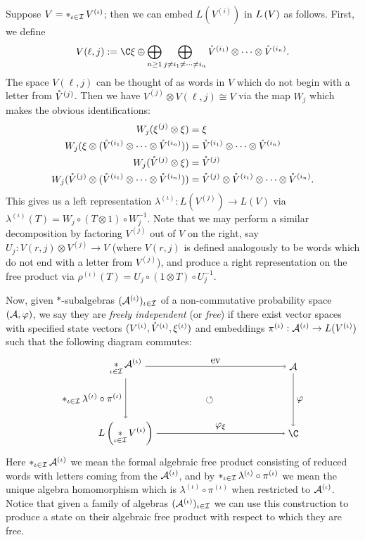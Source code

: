 Suppose $V = \mathop{\ast}_{\iota\in\mathcal{I}}V^{(\iota)}$; then we can embed $L(V^{(i)})$ in $L\left(V\right)$ as follows.
First, we define
$$V(\ell, j) := \C\xi \oplus\bigoplus_{n\geq1}\bigoplus_{j\neq i_1\neq \cdots\neq i_n}\oV^{(i_1)}\otimes\cdots\otimes\oV^{(i_n)}.$$
The space $V(\ell, j)$ can be thought of as words in $V$ which do not begin with a letter from $\mathring{V}^{(j)}$.
Then we have $V^{(j)}\otimes V(\ell, j) \cong V$ via the map $W_j$ which makes the obvious identifications:
\begin{align*}
	W_j(\xi^{(j)}\otimes\xi) &= \xi \\
	W_j(\xi\otimes(\mathring{V}^{(i_1)}\otimes\cdots\otimes\mathring{V}^{(i_n)})) &= \mathring{V}^{(i_1)}\otimes\cdots\otimes\mathring{V}^{(i_n)} \\
	W_j(\mathring{V}^{(j)}\otimes\xi) &= \mathring{V}^{(j)} \\
	W_j(\mathring{V}^{(j)}\otimes(\mathring{V}^{(i_1)}\otimes\cdots\otimes\mathring{V}^{(i_n)})) &= \mathring{V}^{(j)}\otimes\mathring{V}^{(i_1)}\otimes\cdots\otimes\mathring{V}^{(i_n)}.
\end{align*}
This gives us a left representation $\lambda^{(\iota)} : L(V^{(j)}) \to L(V)$ via $\lambda^{(\iota)}(T) = W_j\circ(T\otimes 1)\circ W_j^{-1}$.
Note that we may perform a similar decomposition by factoring $V^{(j)}$ out of $V$ on the right, say $U_j : V(r, j)\otimes V^{(j)} \to V$ (where $V(r, j)$ is defined analogously to be words which do not end with a letter from $V^{(j)}$), and produce a right representation on the free product via $\rho^{(\iota)}(T) = U_j\circ(1\otimes T)\circ U_j^{-1}$.


Now, given $*$-subalgebras $(\mathcal{A}^{(\iota)})_{\iota\in\mathcal{I}}$ of a non-commutative probability space $(\mathcal{A}, \varphi)$, we say they are \emph{freely independent} (or \emph{free}) if there exist vector spaces with specified state vectors $(V^{(\iota)}, \mathring{V}^{(\iota)}, \xi^{(\iota)})$ and embeddings $\pi^{(\iota)} : \mathcal{A}^{(\iota)} \to L(V^{(\iota)})$ such that the following diagram commutes:
	\[\begin{tikzpicture}
		\node (q) at (-3, 1.2) {$\displaystyle\st_{\iota\in\I}\A^{(\iota)}$};
		\node (a) at (-3, -1.2) {$L\paren{\displaystyle\st_{\iota\in\I}V^{(\iota)}}$};
		\node (w) at (3, 1.2) {$\A$};
		\node (s) at (3, -1.2) {$\C$};
		\node at (0,0) {$\circlearrowleft$};

		\draw [->] (q) -- node[above] {$\operatorname{ev}$} (w);
		\draw [->] (q) -- node[left] {$\st_{\iota\in\I}\lambda^{(\iota)}\circ\pi^{(\iota)}$} (a);
		\draw [->] (a) -- node[above] {$\varphi_\xi$} (s);
		\draw [->] (w) -- node[right] {{$\varphi$}} (s);
	\end{tikzpicture}\]
Here $\mathop{\ast}_{\iota\in\mathcal{I}}\mathcal{A}^{(\iota)}$ we mean the formal algebraic free product consisting of reduced words with letters coming from the $\mathcal{A}^{(\iota)}$, and by $\mathop{\ast}_{\iota\in\mathcal{I}}\lambda^{(\iota)}\circ\pi^{(\iota)}$ we mean the unique algebra homomorphism which is $\lambda^{(\iota)}\circ\pi^{(\iota)}$ when restricted to $\mathcal{A}^{(\iota)}$.
Notice that given a family of algebras $(\mathcal{A}^{(\iota)})_{\iota\in\mathcal{I}}$ we can use this construction to produce a state on their algebraic free product with respect to which they are free.

